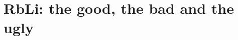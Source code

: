 
\renewcommand{\chaptername}{Appendix}
\renewcommand{\thechapter}{A}


\chapter{RbLi: the good, the bad and the ugly}
\label{app:RbLi}

